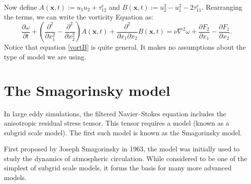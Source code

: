 \documentclass[11pt,a4paper]{article}
\begin{document}
Now define $A(\boldsymbol{x}, t) :=u_1u_2 + \tau_{12}^r$ and $B(\boldsymbol{x}, t)  := u_2^2-u_1^2- 2\tau_{11}^r$. Rearranging the terms, we can write the vorticity Equation as:
\begin{equation}\label{vortB}
\frac{\partial \omega}{\partial t}  + \left(\frac{\partial^2}{\partial x_1^2} - \frac{\partial^2}{\partial x_2^2}\right)A(\boldsymbol{x}, t) + \frac{\partial^2 }{\partial x_1\partial x_2}B(\boldsymbol{x}, t) = \nu{\nabla}^2\omega+\frac{\partial F_2}{\partial x_1} - \frac{\partial F_1}{\partial x_2} .
\end{equation}
Notice that equation \ref{vortB} is quite general. It makes no assumptions about the type of model we are using. 
\section{The Smagorinsky model}
In large eddy simulations, the filtered Navier--Stokes equation includes the anisotropic residual stress tensor. This tensor requires a model (known as a subgrid scale model). The first such model is known as the Smagorinsky model.

First proposed by Joseph Smagorinsky in 1963, the model was initially used to study the dynamics of atmospheric circulation. While considered to be one of the simplest of subgrid scale models, it forms the basis for many more advanced  models. 
\end{document}
